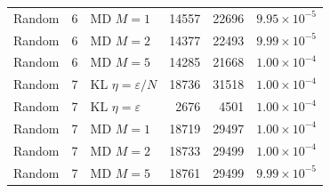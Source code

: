 \begin{table}[t]
\begin{tabular}{lllrrr}
Random & 6 & MD $M=1$ & 14557 & 22696 & $9.95\times 10^{-5}$ \\
Random & 6 & MD $M=2$ & 14377 & 22493 & $9.99\times 10^{-5}$ \\
Random & 6 & MD $M=5$ & 14285 & 21668 & $1.00\times 10^{-4}$ \\
\midrule
Random & 7 & KL $\eta=\varepsilon/N$ & 18736 & 31518 & $1.00\times 10^{-4}$ \\
Random & 7 & KL $\eta=\varepsilon$ & 2676 & 4501 & $1.00\times 10^{-4}$ \\
Random & 7 & MD $M=1$ & 18719 & 29497 & $1.00\times 10^{-4}$ \\
Random & 7 & MD $M=2$ & 18733 & 29499 & $1.00\times 10^{-4}$ \\
Random & 7 & MD $M=5$ & 18761 & 29499 & $9.99\times 10^{-5}$ \\
\bottomrule
\end{tabular}
\end{table}